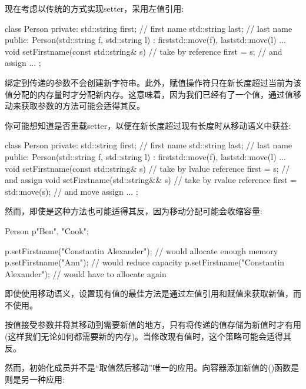现在考虑以传统的方式实现setter，采用左值引用:

\begin{cppcode}
class Person {
private:
	std::string first; // first name
	std::string last; // last name
public:
	Person(std::string f, std::string l)
	: first{std::move(f)}, last{std::move(l)} {
	}
	...
	void setFirstname(const std::string& s) { // take by reference
		first = s; // and assign
	}
	...
};
\end{cppcode}

绑定到传递的参数不会创建新字符串。此外，赋值操作符只在新长度超过当前为该值分配的内存量时才分配新内存。这意味着，因为我们已经有了一个值，通过值移动来获取参数的方法可能会适得其反。

你可能想知道是否重载setter，以便在新长度超过现有长度时从移动语义中获益:

\begin{cppcode}
class Person {
private:
	std::string first; // first name
	std::string last; // last name
public:
	Person(std::string f, std::string l)
	: first{std::move(f)}, last{std::move(l)} {
	}
	...
	void setFirstname(const std::string& s) { // take by lvalue reference
		first = s; // and assign
	}
	void setFirstname(std::string&& s) { // take by rvalue reference
		first = std::move(s); // and move assign
	}
	...
};
\end{cppcode}

然而，即使是这种方法也可能适得其反，因为移动分配可能会收缩容量:

\begin{cppcode}
Person p{"Ben", "Cook"};

p.setFirstname("Constantin Alexander"); // would allocate enough memory
p.setFirstname("Ann"); // would reduce capacity
p.setFirstname("Constantin Alexander"); // would have to allocate again
\end{cppcode}

即使使用移动语义，设置现有值的最佳方法是通过左值引用和赋值来获取新值，而不使用。

按值接受参数并将其移动到需要新值的地方，只有将传递的值存储为新值时才有用(这样我们无论如何都需要新的内存)。当修改现有值时，这个策略可能会适得其反。

然而，初始化成员并不是“取值然后移动”唯一的应用。向容器添加新值的()函数是则是另一种应用:

